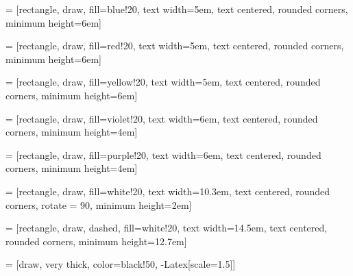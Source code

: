 
 = [rectangle, draw, fill=blue!20,
    text width=5em, text centered, rounded corners, minimum height=6em]
    
 = [rectangle, draw, fill=red!20,
    text width=5em, text centered, rounded corners, minimum height=6em]
    
 = [rectangle, draw, fill=yellow!20,
    text width=5em, text centered, rounded corners, minimum height=6em]
    
 = [rectangle, draw, fill=violet!20,
    text width=6em, text centered, rounded corners, minimum height=4em]
    
 = [rectangle, draw, fill=purple!20,
    text width=6em, text centered, rounded corners, minimum height=4em]
    
 = [rectangle, draw, fill=white!20,
    text width=10.3em, text centered, rounded corners, rotate = 90, minimum height=2em]
    
 = [rectangle, draw, dashed, fill=white!20,
    text width=14.5em, text centered, rounded corners, minimum height=12.7em]
    
 = [draw, very thick, color=black!50, -{Latex[scale=1.5]}]

